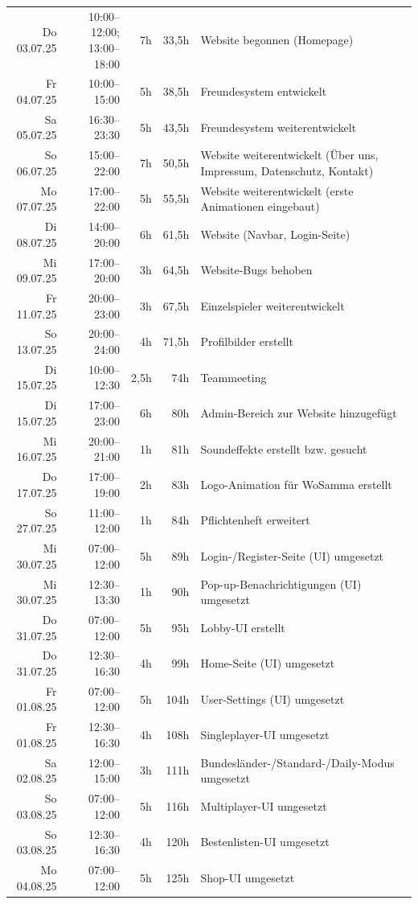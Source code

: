 \begin{longtable}{r | r | r | r | p{}}
	Do 03.07.25 & 10:00--12:00; 13:00--18:00 & 7h & 33{,}5h & Website begonnen (Homepage) \\
	Fr 04.07.25 & 10:00--15:00 & 5h & 38{,}5h & Freundesystem entwickelt \\
	Sa 05.07.25 & 16:30--23:30 & 5h & 43{,}5h & Freundesystem weiterentwickelt \\
	So 06.07.25 & 15:00--22:00 & 7h & 50{,}5h & Website weiterentwickelt (Über uns, Impressum, Datenschutz, Kontakt) \\
	Mo 07.07.25 & 17:00--22:00 & 5h & 55{,}5h & Website weiterentwickelt (erste Animationen eingebaut) \\
	Di 08.07.25 & 14:00--20:00 & 6h & 61{,}5h & Website (Navbar, Login-Seite) \\
	Mi 09.07.25 & 17:00--20:00 & 3h & 64{,}5h & Website-Bugs behoben \\
	Fr 11.07.25 & 20:00--23:00 & 3h & 67{,}5h & Einzelspieler weiterentwickelt \\
	So 13.07.25 & 20:00--24:00 & 4h & 71{,}5h & Profilbilder erstellt \\

	Di 15.07.25 & 10:00--12:30 & 2{,}5h & 74h & Teammeeting \\
	Di 15.07.25 & 17:00--23:00 & 6h & 80h & Admin-Bereich zur Website hinzugefügt \\
	Mi 16.07.25 & 20:00--21:00 & 1h & 81h & Soundeffekte erstellt bzw. gesucht \\
	Do 17.07.25 & 17:00--19:00 & 2h & 83h & Logo-Animation für WoSamma erstellt \\

	So 27.07.25 & 11:00--12:00 & 1h & 84h & Pflichtenheft erweitert \\

	Mi 30.07.25 & 07:00--12:00 & 5h & 89h & Login-/Register-Seite (UI) umgesetzt \\
	Mi 30.07.25 & 12:30--13:30 & 1h & 90h & Pop-up-Benachrichtigungen (UI) umgesetzt \\
	Do 31.07.25 & 07:00--12:00 & 5h & 95h & Lobby-UI erstellt \\
	Do 31.07.25 & 12:30--16:30 & 4h & 99h & Home-Seite (UI) umgesetzt \\
	Fr 01.08.25 & 07:00--12:00 & 5h & 104h & User-Settings (UI) umgesetzt \\
	Fr 01.08.25 & 12:30--16:30 & 4h & 108h & Singleplayer-UI umgesetzt \\
	Sa 02.08.25 & 12:00--15:00 & 3h & 111h & Bundesländer-/Standard-/Daily-Modus umgesetzt \\
	So 03.08.25 & 07:00--12:00 & 5h & 116h & Multiplayer-UI umgesetzt \\
	So 03.08.25 & 12:30--16:30 & 4h & 120h & Bestenlisten-UI umgesetzt \\
	Mo 04.08.25 & 07:00--12:00 & 5h & 125h & Shop-UI umgesetzt \\


\end{longtable}
